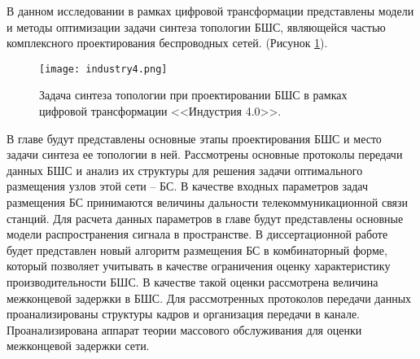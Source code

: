 



В данном исследовании в рамках цифровой трансформации представлены модели и методы оптимизации задачи синтеза топологии БШС, являющейся частью комплексного проектирования беспроводных сетей. 
 (Рисунок \cref{fig:industry4}).

\begin{figure}[h!]
  \centering
   \texttt{[image: industry4.png]}
\caption{Задача синтеза топологии при проектировании БШС в рамках цифровой трансформации <<Индустрия 4.0>>.}
\label{fig:industry4}
\end{figure}

В главе будут представлены основные этапы проектирования БШС и место задачи синтеза ее топологии в ней. Рассмотрены основные протоколы передачи данных БШС и анализ их структуры для решения задачи оптимального размещения узлов этой сети -- БС. В качестве входных параметров задач размещения БС принимаются величины дальности телекоммуникационной связи станций. Для расчета данных параметров в главе будут представлены основные модели распространения сигнала в пространстве. В диссертационной работе будет представлен новый алгоритм размещения БС в комбинаторный форме, который позволяет учитывать в качестве ограничения оценку характеристику производительности БШС. В качестве такой оценки рассмотрена величина 
межконцевой задержки в БШС. Для рассмотренных протоколов передачи данных проанализированы структуры кадров и организация передачи в канале. Проанализирована аппарат теории массового обслуживания для оценки межконцевой задержки сети. 

